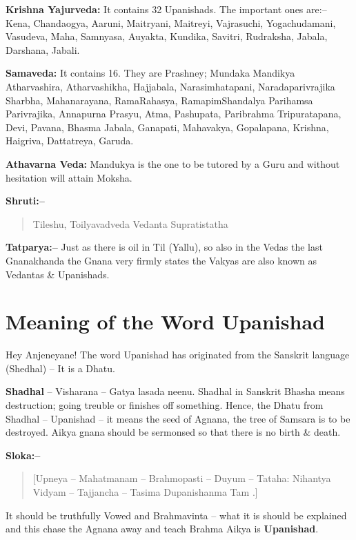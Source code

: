 \textbf{Krishna Yajurveda:} It contains 32 Upanishads. The important ones are:– Kena, Chandaogya, Aaruni, Maitryani, Maitreyi, Vajrasuchi, Yogachudamani, Vasudeva, Maha, Samnyasa, Auyakta, Kundika, Savitri, Rudraksha, Jabala, Darshana, Jabali.

\textbf{Samaveda:} It contains 16. They are Prashney; Mundaka Mandikya Atharvashira, Atharvashikha, Hajjabala, Narasimhatapani, Naradaparivrajika Sharbha, Mahanarayana, RamaRahasya, RamapimShandalya Parihamsa Parivrajika, Annapurna Prasyu, Atma, Pashupata, Paribrahma Tripuratapana, Devi, Pavana, Bhasma Jabala, Ganapati, Mahavakya, Gopalapana, Krishna, Haigriva, Dattatreya, Garuda.

\textbf{Athavarna Veda:} Mandukya is the one to be tutored by a Guru and without hesitation will attain Moksha.

\textbf{Shruti:–}

\begin{verse}
Tileshu, Toilyavadveda Vedanta Supratistatha 
\end{verse}

\textbf{Tatparya:–} Just as there is oil in Til (Yallu), so also in the Vedas the last Gnanakhanda the Gnana very firmly states the Vakyas are also known as Vedantas \& Upanishads.

\chapter{Meaning of the Word Upanishad}

Hey Anjeneyane! The word Upanishad has originated from the Sanskrit language (Shedhal) – It is a Dhatu.

\textbf{Shadhal} – Visharana – Gatya lasada neenu. Shadhal in Sanskrit Bhasha means destruction; going treuble or finishes off something. Hence, the Dhatu from Shadhal – Upanishad – it means the seed of Agnana, the tree of Samsara is to be destroyed. Aikya gnana should be sermonsed so that there is no birth \& death.

\textbf{Sloka:–}

\begin{verse}
[Upneya – Mahatmanam – Brahmopasti – Duyum – Tataha: Nihantya Vidyam – Tajjancha – Tasima Dupanishanma Tam .]
\end{verse}

It should be truthfully Vowed and Brahmavinta – what it is should be explained and this chase the Agnana away and teach Brahma Aikya is \textbf{Upanishad}.

